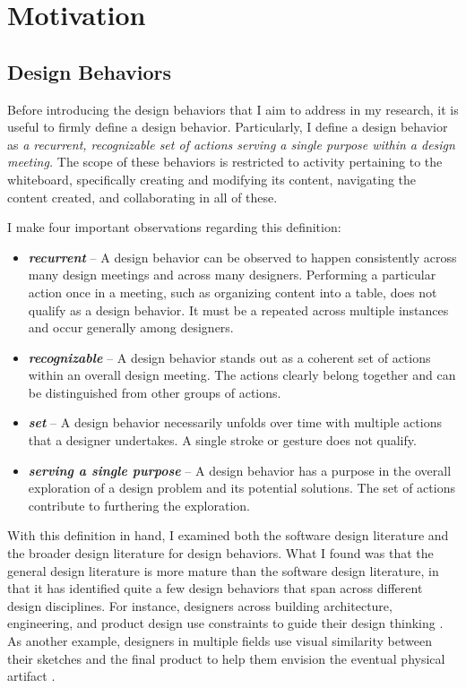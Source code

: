 \chapter{Motivation}
\label{chapter:motivation}

\section{Design Behaviors}

Before introducing the design behaviors that I aim to address in my research, it is useful to firmly define a design behavior. Particularly, I define a design behavior as \emph{a recurrent, recognizable set of actions serving a single purpose within a design meeting.} The scope of these behaviors is restricted to activity pertaining to the whiteboard, specifically creating and modifying its content, navigating the content created, and collaborating in all of these.

I make four important observations regarding this definition:

\begin{itemize}
\item \textbf{\emph{recurrent}} -- A design behavior can be observed to happen consistently across many design meetings and across many designers. Performing a particular action once in a meeting, such as organizing content into a table, does not qualify as a design behavior. It must be a repeated across multiple instances and occur generally among designers.
\item \textbf{\emph{recognizable}} -- A design behavior stands out as a coherent set of actions within an overall design meeting. The actions clearly belong together and can be distinguished from other groups of actions.
\item \textbf{\emph{set}} -- A design behavior necessarily unfolds over time with multiple actions that a designer undertakes. A single stroke or gesture does not qualify. 
\item \textbf{\emph{serving a single purpose}} -- A design behavior has a purpose in the overall exploration of a design problem and its potential solutions. The set of actions contribute to furthering the exploration.  
\end{itemize}

With this definition in hand, I examined both the software design literature and the broader design literature for design behaviors. What I found was that the general design literature is more mature than the software design literature, in that it has identified quite a few design behaviors that span across different design disciplines. For instance, designers across building architecture, engineering, and product design use constraints to guide their design thinking \cite{cross2007designerly}. As another example, designers in multiple fields use visual similarity between their sketches and the final product to help them envision the eventual physical artifact \cite{do1998right}.
  
